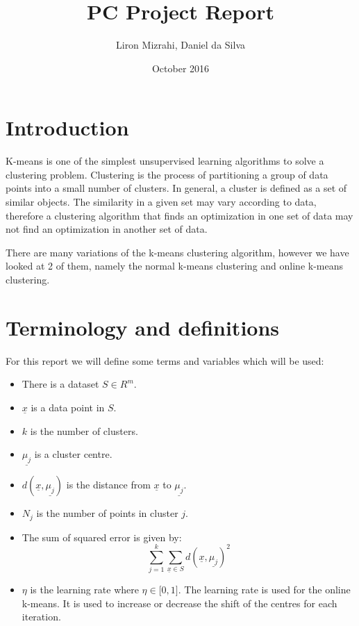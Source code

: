 \documentclass{article}
\title{PC Project Report}
\author{Liron Mizrahi, Daniel da Silva}
\date{October 2016}
\begin{document}
\maketitle


\newpage
\section{Introduction}
K-means is  one of the simplest unsupervised learning algorithms to solve a clustering problem. Clustering is the process of partitioning a group of data points into a small number of clusters. In general, a cluster is defined as a set of similar objects. The similarity in a given set may vary according to data, therefore a clustering algorithm that finds an optimization in one set of data may not find an optimization in another set of data.

There are many variations of the k-means clustering algorithm, however we have looked at 2 of them, namely the normal k-means clustering and online k-means clustering.


\section{Terminology and definitions}
For this report we will define some terms and variables which will be used:
\begin{itemize}
	\item There is a dataset $S \in R^m$.
	\item $\underline{x}$ is a data point in $S$.
	\item $k$ is the number of clusters.
	\item $\underline{\mu_j}$ is a cluster centre.
	\item $d(\underline{x}, \underline{\mu_j})$ is the distance from $\underline{x}$ to $\underline{\mu_j}$.
	\item $N_j$ is the number of points in cluster $j$.
	\item The sum of squared error is given by:
    $$\sum_{j=1}^{k}\sum_{\underline{x} \in S} d(\underline{x}, \underline{\mu_j})^2 $$
	\item $\eta$ is the learning rate where $\eta \in \big[0, 1\big]$. The learning rate is used for the online k-means. It is used to increase or decrease the shift of the centres for each iteration.
\end{itemize}


\newpage
\end{document}

